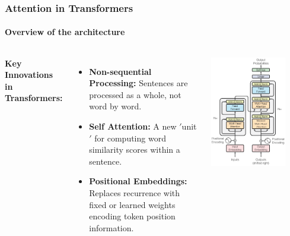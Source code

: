 \documentclass{beamer}
\begin{document}
    \begin{frame}
        \frametitle{Attention in Transformers}
        \framesubtitle{Overview of the architecture}
        
        \begin{columns}[T]
            \textbf{Key Innovations in Transformers:}
            \begin{itemize}
                \item \textbf{Non-sequential Processing:} Sentences are processed as a whole, not word by word.
                \item \textbf{Self Attention:} A new $'$unit$'$ for computing word similarity scores within a sentence.
                \item \textbf{Positional Embeddings:} Replaces recurrence with fixed or learned weights encoding token position information.
            \end{itemize}
            \includegraphics[width=0.8\textwidth]{images/attention_architecture.png}
        \end{columns}
    \end{frame}
    
\end{document}

